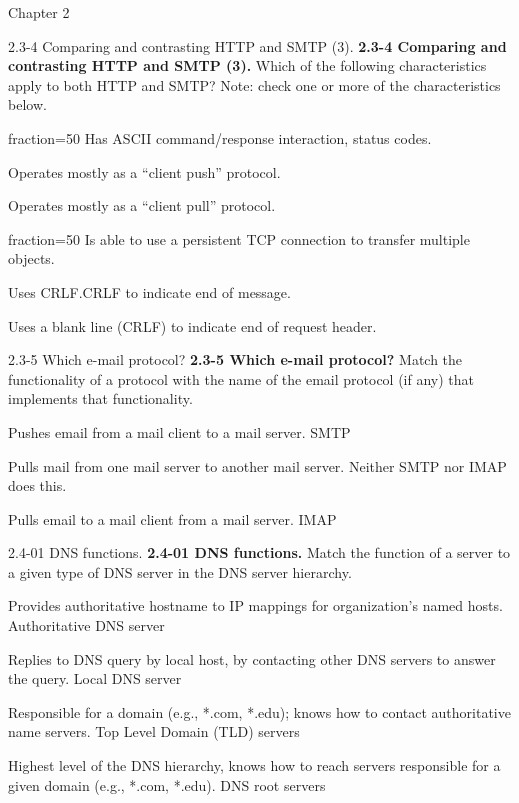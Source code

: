 \documentclass[11pt]{article}
\begin{document}
\begin{quiz}{Chapter 2}
\begin{multi}[points=1,shuffle,multiple]{2.3-4 Comparing and contrasting HTTP and SMTP (3).}
\textbf{2.3-4 Comparing and contrasting HTTP and SMTP (3).} 
Which of the following characteristics apply to both HTTP and SMTP? 
Note: check one or more of the characteristics below.
\item[fraction=50] Has ASCII command/response interaction, status codes.
\item Operates mostly as a ``client push'' protocol.
\item Operates mostly as a ``client pull'' protocol.
\item[fraction=50] Is able to use a persistent TCP connection to transfer multiple objects.
\item Uses CRLF.CRLF to indicate end of message.
\item Uses a blank line (CRLF) to indicate end of request header.
\end{multi}

\begin{matching}[points=1,shuffle]{2.3-5 Which e-mail protocol?}
\textbf{2.3-5 Which e-mail protocol?}  
Match the functionality of a protocol with the name of the email protocol (if any) that implements that functionality.
\item Pushes email from a mail client to a mail server. \answer SMTP
\item Pulls mail from one mail server to another mail server. \answer Neither SMTP nor IMAP does this.
\item Pulls email to a mail client from a mail server. \answer IMAP
\end{matching}

\begin{matching}[points=1,shuffle]{2.4-01 DNS functions.}
\textbf{2.4-01 DNS functions.} 
Match the function of a server to a given type of DNS server in the  DNS server hierarchy.
\item Provides authoritative hostname to IP mappings for organization's named hosts. \answer Authoritative DNS server
\item Replies to DNS query by local host, by contacting other DNS servers to answer the query. \answer Local DNS server
\item Responsible for a domain (e.g., *.com, *.edu); knows how to contact authoritative name servers. \answer Top Level Domain (TLD) servers
\item Highest level of the DNS hierarchy, knows how to reach servers responsible for a given domain (e.g., *.com, *.edu). \answer DNS root servers
\end{matching}


\end{quiz}
\end{document}
